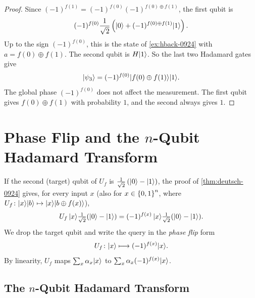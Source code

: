 \begin{exercisebox}
\begin{proof}
    Since $(-1)^{f(1)} = (-1)^{f(0)} (-1)^{f(0) \oplus f(1)}$, the first qubit is
    \[(-1)^{f(0)} \frac{1}{\sqrt{2}}\left(\lvert 0 \rangle + (-1)^{f(0) \oplus f(1)}\lvert 1 \rangle\right).\]
    Up to the sign $(-1)^{f(0)}$, this is the state of \cref{ex:hback-0924} with
    $a = f(0) \oplus f(1)$. The second qubit is $H\lvert 1 \rangle$. So the last two Hadamard gates give
    \[\lvert \psi_3 \rangle = (-1)^{f(0)} \lvert f(0) \oplus f(1) \rangle \lvert 1 \rangle.\]
    The global phase $(-1)^{f(0)}$ does not affect the measurement. The first qubit gives
    $f(0) \oplus f(1)$ with probability $1$, and the second always gives $1$.
\end{proof}
\end{exercisebox}

\section{Phase Flip and the \texorpdfstring{$n$}{n}-Qubit Hadamard Transform}

If the second (target) qubit of $U_f$ is $\frac{1}{\sqrt{2}}\left(\lvert 0 \rangle - \lvert 1 \rangle\right)$, the
proof of \cref{thm:deutsch-0924} gives, for every input $x$ (also for $x \in \left\lbrace0,1\right\rbrace^n$, where
$U_f \colon \lvert x \rangle\lvert b \rangle \mapsto \lvert x \rangle\lvert b \oplus f(x) \rangle$),
\[U_f \, \lvert x \rangle \tfrac{1}{\sqrt{2}}(\lvert 0 \rangle - \lvert 1 \rangle) = (-1)^{f(x)} \, \lvert x \rangle \tfrac{1}{\sqrt{2}}(\lvert 0 \rangle - \lvert 1 \rangle).\]
We drop the target qubit and write the query in the \emph{phase flip} form
\[U_f \colon \lvert x \rangle \longmapsto (-1)^{f(x)} \lvert x \rangle.\]
By linearity, $U_f$ maps $\sum_x \alpha_x \lvert x \rangle$ to $\sum_x \alpha_x (-1)^{f(x)} \lvert x \rangle$.

\subsection{The \texorpdfstring{$n$}{n}-Qubit Hadamard Transform}

